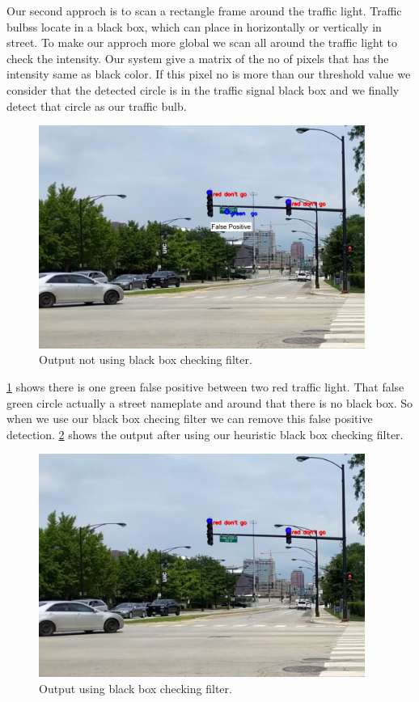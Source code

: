 Our second approch is to scan a rectangle frame  around the traffic light.
Traffic bulbss locate in a black box, which can place in horizontally or vertically in street.
To make our approch more global we scan all around the traffic light to check the intensity.
Our system give a matrix of the no of pixels that has the intensity same as black color.
If this pixel no is more than our threshold value we consider that the detected circle is in the traffic signal black box and we finally detect that circle as our traffic bulb.
\begin{figure}[h!]
\centering
\includegraphics[width=4.2in]{images/norec_filter.pdf}
\caption{Output not using black box checking filter.}
\label{f:norec_filter}
\end{figure}

\ref{f:norec_filter} shows there is one green false positive between two red traffic light.
That false green circle actually a street nameplate and around that there is no black box.
So when we use our black box checing filter we can remove this false positive detection.
\ref{f:rec_filter} shows the output after using our heuristic black box checking filter.




\begin{figure}[ht!]
\centering
\includegraphics[width=4.2in]{images/rec_filter.pdf}
\caption{Output using black box checking filter.}
\label{f:rec_filter}
\end{figure}

